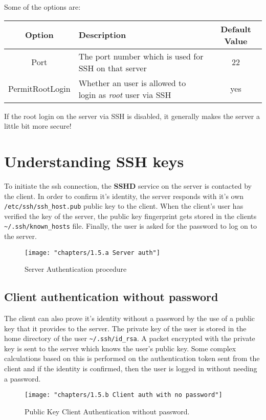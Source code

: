 Some of the options are:

\begin{tabular}{clc}
	\toprule
	\textbf{Option} &\textbf{Description} &\textbf{Default Value} \\
	\midrule
	Port	&The port number which is used for SSH on that server &22\\
	PermitRootLogin &Whether an user is allowed to login as \textit{root} user via SSH &yes \\
	\bottomrule
\end{tabular}

If the root login on the server via SSH is disabled, it generally makes the server a little bit more secure!

\section{Understanding SSH keys}
To initiate the ssh connection, the \textbf{SSHD} service on the server is contacted by the client. In order to confirm it's identity, the server responds with it's own \verb|/etc/ssh/ssh_host.pub| public key to the client. When the client's user has verified the key of the server, the public key fingerprint gets stored in the clients \verb|~/.ssh/known_hosts| file. Finally, the user is asked for the password to log on to the server.

\begin{figure}[H]
	\centering
	\texttt{[image: "chapters/1.5.a Server auth"]}
	\caption{Server Authentication procedure}
	\label{fig:1}
\end{figure}

\subsection{Client authentication without password}
The client can also prove it's identity without a password by the use of a public key that it provides to the server. The private key of the user is stored in the home directory of the user \verb|~/.ssh/id_rsa|. A packet encrypted with the private key is sent to the server which knows the user's public key. Some complex calculations based on this is performed on the authentication token sent from the client and if the identity is confirmed, then the user is logged in without needing a password.

\begin{figure}[H]
	\centering
	\texttt{[image: "chapters/1.5.b Client auth with no password"]}
	\caption{Public Key Client Authentication without password.}
	\label{fig:1}
\end{figure}

